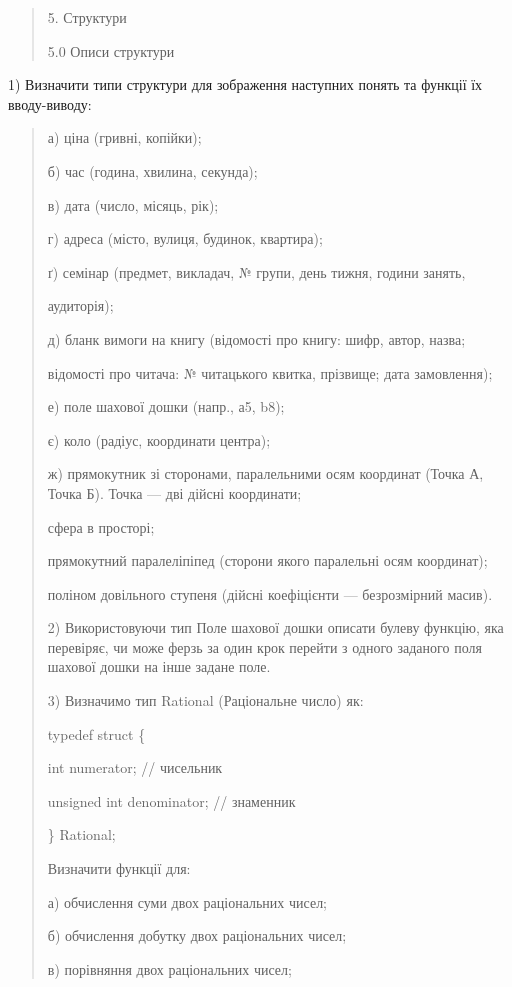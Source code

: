 \documentclass[]{article}
\begin{document}
\begin{quote}
\protect\hypertarget{_Hlk48905535}{}{}5. Структури

5.0 Описи структури
\end{quote}

1) Визначити типи структури для зображення наступних понять та функції
їх вводу-виводу:

\begin{quote}
а) ціна (гривні, копійки);

б) час (година, хвилина, секунда);

в) дата (число, місяць, рік);

г) адреса (місто, вулиця, будинок, квартира);

ґ) семінар (предмет, викладач, № групи, день тижня, години занять,

аудиторія);

д) бланк вимоги на книгу (відомості про книгу: шифр, автор, назва;

відомості про читача: № читацького квитка, прізвище; дата замовлення);

е) поле шахової дошки (напр., а5, b8);

є) коло (радіус, координати центра);

ж) прямокутник зі сторонами, паралельними осям координат (Точка А, Точка
Б). Точка --- дві дійсні координати;

сфера в просторі;

прямокутний паралеліпіпед (сторони якого паралельні осям координат);

поліном довільного ступеня (дійсні коефіцієнти --- безрозмірний масив).

2) Використовуючи тип Поле шахової дошки описати булеву функцію, яка
перевіряє, чи може ферзь за один крок перейти з одного заданого поля
шахової дошки на інше задане поле.

3) Визначимо тип Rational (Раціональне число) як:

typedef struct \{

int numerator; // чисельник

unsigned int denominator; // знаменник

\} Rational;

Визначити функції для:

а) обчислення суми двох раціональних чисел;

б) обчислення добутку двох раціональних чисел;

в) порівняння двох раціональних чисел;


\end{quote}
\end{document}
